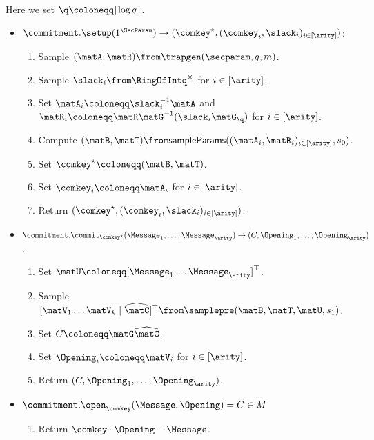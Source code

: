 \begin{construction}
		Here we set $\q \coloneqq \lceil \log q \rceil$.
		\begin{itemize}[noitemsep]
			\item[] $\commitment.\setup(1^\SecParam) \rightarrow (\comkey^\star,(\comkey_i,\slack_i)_{i\in [\arity]})$:
			\begin{enumerate}[nolistsep]
        \item Sample $(\matA, \matR) \from \trapgen(\secparam, q, m)$.
        \item Sample $\slack_i \from \RingOfIntq^\times$ for $i \in [\arity]$.
        \item Set $\matA_i \coloneqq \slack^{-1}_i \matA$ and $\matR_i \coloneqq \matR \matG^{-1}(\slack_i \matG_\q)$ for $i \in [\arity]$.
        \item Compute $(\matB, \matT) \from \sampleParams((\matA_i, \matR_i)_{i \in [\arity]}, s_0)$.
				\item Set $\comkey^\star \coloneqq (\matB, \matT)$.
				\item Set $\comkey_i \coloneqq \matA_i$ for $i \in [\arity]$.
				\item Return $(\comkey^\star,(\comkey_i,\slack_i)_{i\in [\arity]})$.
			\end{enumerate}
		\end{itemize}
		\begin{itemize}[noitemsep]
			\item[] $\commitment.\commit_{\comkey^\star}(\Message_1,\ldots,\Message_\arity) \rightarrow (C, \Opening_1,\ldots,\Opening_\arity)$.
			\begin{enumerate}[nolistsep]
				\item Set $\matU \coloneqq [\Message_1 \dots \Message_\arity]^\top$.
				\item Sample $[\matV_1 \dots \matV_k \;\vert\; \widehat{\matC}]^\top \from \samplepre(\matB, \matT, \matU, s_1)$.
				\item Set $C \coloneqq \matG \widehat{\matC}$.
				\item Set $\Opening_i \coloneqq \matV_i$ for $i \in [\arity]$.
				\item Return $(C, \Opening_1,\ldots,\Opening_\arity)$.
			\end{enumerate}
		\end{itemize}
		\begin{itemize}[noitemsep]
			\item[] $\commitment.\open_{\comkey}(\Message, \Opening) = C \in M$ 
			\begin{enumerate}[nolistsep]
				\item Return $\comkey \cdot \Opening - \Message$.
			\end{enumerate}
		\end{itemize}
\end{construction}
